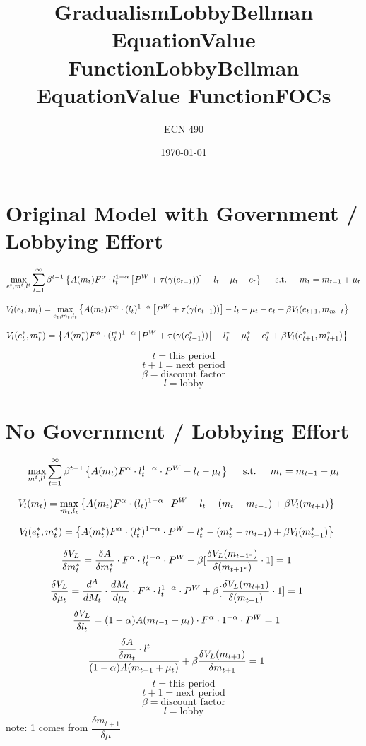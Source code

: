 \documentclass[12pt]{article}
\begin{document}
\title{\vskip-0.6in Gradualism}
\author{ECN 490}
\date{\today}
\maketitle


\section{Original Model with Government / Lobbying Effort}
\title{Lobby}
\[
\max_{e^t,m^t,l^t} \sum_{t=1}^\infty \beta^{t-1}\left\{A(m_t)F^\alpha\cdot l^{1-\alpha}_t\left[P^W+\tau(\gamma(e_{t-1}))\right]-l_t-\mu_t-e_t
  \right\} \hskip.2in \text{s.t.} \hskip.2in  m_t=m_{t-1}+\mu_t
\]

 
\title{Bellman Equation}
\[
  V_l(e_t,m_t)=\max_{e_t,m_t,l_t}\left\{A(m_t)F^\alpha\cdot (l_t)^{1-\alpha}\left[P^W+\tau(\gamma(e_{t-1}))\right]-l_t-\mu_t-e_t+\beta V_l(e_{t+1},m_{m+t}
  \right\} \hskip.2in 
\]
\title{Value Function}
\[
  V_l(e_t^\ast,m_t^\ast)=\left\{A(m_t^\ast)F^\alpha\cdot (l^\ast_t)^{1-\alpha}\left[P^W+\tau(\gamma(e_{t-1}^\ast))\right]-l_t^\ast-\mu_t^\ast-e_t^\ast+\beta V_l(e^\ast_{t+1},m^\ast_{t+1})
  \right\} \hskip.2in
\]

\[
t=\text{this period}
\]
\[
t+1=\text{next period}
\]
\[
\beta=\text{discount factor}
\]
\[
l=\text{lobby}
\]

\section{No Government / Lobbying Effort}
\title{Lobby}
\[
\max_{m^t,l^t} \sum_{t=1}^\infty \beta^{t-1}\left\{A(m_t)F^\alpha\cdot l^{1-\alpha}_t\cdot P^W-l_t-\mu_t
  \right\} \hskip.2in \text{s.t.} \hskip.2in  m_t=m_{t-1}+\mu_t
\]

 
\title{Bellman Equation}
\[
  V_l(m_t)=\max_{m_t,l_t}\left\{A(m_t)F^\alpha\cdot (l_t)^{1-\alpha}\cdot P^W-l_t-(m_t-m_{t-1})+\beta V_l(m_{t+1})
  \right\} \hskip.2in 
\]
\title{Value Function}
\[
  V_l(e_t^\ast,m_t^\ast)=\left\{A(m_t^\ast)F^\alpha\cdot (l^\ast_t)^{1-\alpha}\cdot P^W-l_t^\ast-(m^\ast_t-m_{t-1})+\beta V_l(m^\ast_{t+1})
  \right\} \hskip.2in
\]
\title{FOCs}
\[\dfrac{\delta V_L}{\delta m_t^\ast}=\dfrac{\delta A}{\delta m^\ast_t} \cdot F^\alpha \cdot l^{1-\alpha}_t \cdot P^W +\beta [\dfrac{\delta V_L(m_{t+1^\ast})}{\delta(m_{t+1^\ast})} \cdot 1] =1
\hskip.2in
\]
\[
\dfrac{\delta V_L}{\delta \mu_t}=\dfrac{d^A}{dM_t} \cdot \dfrac{dM_t}{d\mu_t} \cdot F^\alpha \cdot l_t^{1-\alpha} \cdot P^W + \beta[\dfrac{\delta V_L(m_{t+1})}{\delta(m_{t+1})} \cdot 1] =1
\hskip.2in 
\]
\[
\dfrac{\delta V_L}{\delta l_t}= (1-\alpha) A(m_{t-1}+\mu_t) \cdot F^\alpha \cdot 1^{-\alpha} \cdot P^W =1
\hskip.2in 
\]
\[
\dfrac{\dfrac{\delta A}{\delta m_t} \cdot l^t}{(1-\alpha) A(m_{t+1}+\mu_t)} +\beta \dfrac{\delta V_L (m_{t+1})}{\delta m_{t+1}} =1
\hskip.2in
\]
\[
t=\text{this period}
\]
\[
t+1=\text{next period}
\]
\[
\beta=\text{discount factor}
\]
\[
l=\text{lobby}
\]
note: 1 comes from $\dfrac{\delta m_{t+1}}{\delta \mu}$
\end{document}
